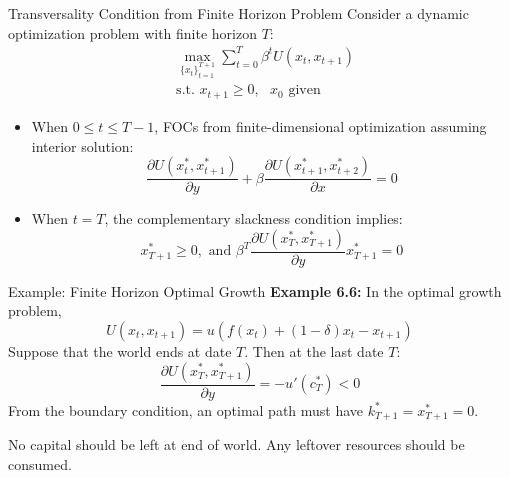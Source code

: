 \documentclass[9pt,aspectratio=169]{beamer}
\begin{document}
\begin{frame}{Transversality Condition from Finite Horizon Problem}
    Consider a dynamic optimization problem with finite horizon $T$:
    \begin{align*}
        &\max_{\{x_t\}_{t=1}^{T+1}} \sum_{t=0}^T \beta^t U(x_t, x_{t+1}) \\
        &\text{s.t. } x_{t+1} \geq 0, \text{ } x_0 \text{ given}
    \end{align*}
    \vspace{-2ex}
    \begin{itemize}
        \item When $0 \leq t \leq T-1$, FOCs from finite-dimensional
        optimization assuming interior solution:
        \begin{equation*}
            \frac{\partial U(x^*_t, x^*_{t+1})}{\partial y} + \beta
            \frac{\partial U(x^*_{t+1}, x^*_{t+2})}{\partial x} = 0 
        \end{equation*}
        
        \item When $t = T$, the complementary slackness condition implies:
        \begin{equation*}
            x^*_{T+1} \geq 0, \text{ and } \beta^T \frac{\partial U(x^*_T,
              x^*_{T+1})}{\partial y} x^*_{T+1} = 0 
        \end{equation*}
    \end{itemize}
\end{frame}

\begin{frame}{Example: Finite Horizon Optimal Growth}
    \textbf{Example 6.6:} In the optimal growth problem,
    \begin{equation*}
        U(x_t, x_{t+1}) = u(f(x_t) + (1-\delta)x_t - x_{t+1})
    \end{equation*}
    Suppose that the world ends at date $T$. Then at the last date $T$:
    $$\frac{\partial U(x^*_T, x^*_{T+1})}{\partial y} = -u'(c^*_T) < 0$$
    From the boundary condition, an optimal path must have $k^*_{T+1} = x^*_{T+1} = 0$.

    No capital should be left at end of world. Any leftover resources should
    be consumed.
\end{frame}
\end{document}
